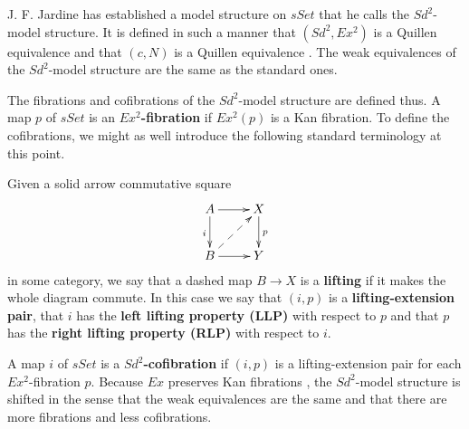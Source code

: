 J. F. Jardine \cite{Ja13} has established a model structure on $sSet$ that he calls the $Sd^2$-model structure. It is defined in such a manner that $(Sd^2,Ex^2)$ is a Quillen equivalence \cite[Thm.~1.1.,~p.~274]{Ja13} and that $(c,N)$ is a Quillen equivalence \cite[Thm.~3.1.,~p.~286]{Ja13}. The weak equivalences of the $Sd^2$-model structure are the same as the standard ones.

The fibrations and cofibrations of the $Sd^2$-model structure are defined thus. A map $p$ of $sSet$ is an \textbf{$Ex^2$-fibration} if $Ex^2(p)$ is a Kan fibration. To define the cofibrations, we might as well introduce the following standard terminology at this point.
\begin{definition}
Given a solid arrow commutative square
\begin{displaymath}
\xymatrix{
A \ar[d]_i \ar[r] & X \ar[d]^p \\
B \ar[r] \ar@{-->}[ur] & Y
}
\end{displaymath}
in some category, we say that a dashed map $B\to X$ is a \textbf{lifting} if it makes the whole diagram commute. In this case we say that $(i,p)$ is a \textbf{lifting-extension pair}, that $i$ has the \textbf{left lifting property (LLP)} with respect to $p$ and that $p$ has the \textbf{right lifting property (RLP)} with respect to $i$.
\end{definition}
\noindent A map $i$ of $sSet$ is a \textbf{$Sd^2$-cofibration} if $(i,p)$ is a lifting-extension pair for each $Ex^2$-fibration $p$. Because $Ex$ preserves Kan fibrations \cite[Lem.~4.6.15, p.~213]{FP90}, the $Sd^2$-model structure is shifted in the sense that the weak equivalences are the same and that there are more fibrations and less cofibrations.









